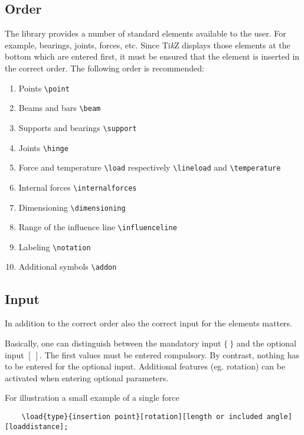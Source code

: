 \documentclass[%
  a4paper,
  BCOR20mm,
  pointlessnumbers,
  twoside,
  halfparskip,
  openright,
]{scrreprt}
\newcommand{\tikzsym}{Ti\emph{k}Z }
\begin{document}
\subsection{Order}
\label{sec:Reihenfolge}

The library provides a number of standard elements available to the user. For example, bearings, joints, forces, etc. Since \tikzsym displays those elements at the bottom which are entered first, it must be ensured that the element is inserted in the correct order. The following order is recommended:

\begin{enumerate}
	\item Points \lstinline|\point|
	\item Beams and bars \lstinline|\beam|
	\item Supports and bearings \lstinline|\support|
	\item Joints \lstinline|\hinge|
	\item Force and temperature \lstinline|\load| respectively \lstinline|\lineload| and \lstinline|\temperature|
	\item Internal forces \lstinline|\internalforces|
	\item Dimensioning \lstinline|\dimensioning|
	\item Range of the influence line \lstinline|\influenceline|
	\item Labeling \lstinline|\notation|
	\item Additional symbols \lstinline|\addon|
\end{enumerate}

\subsection{Input}
\label{sec:Eingabe}

In addition to the correct order also the correct input for the elements matters.

Basically, one can distinguish between the mandatory input $\{~\}$ and the optional input $[~]$. The first values must be entered compulsory. By contrast, nothing has to be entered for the optional input. Additional features (eg. rotation) can be activated when entering optional parameters.

For illustration a small example of a single force

\begin{lstlisting}
	\load{type}{insertion point}[rotation][length or included angle][loaddistance];
\end{lstlisting} 
\end{document}
